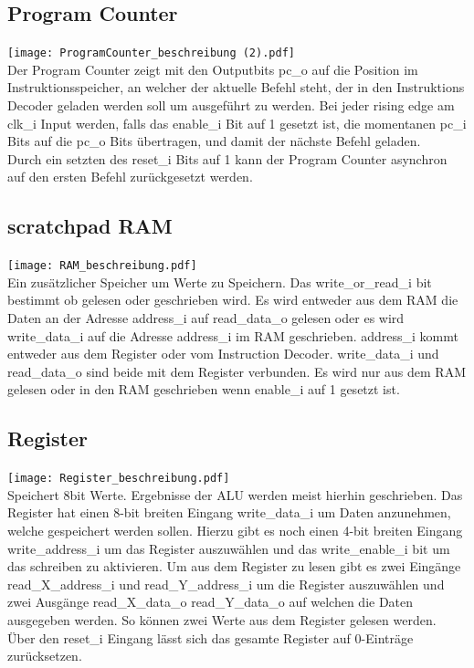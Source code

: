 \documentclass{scrartcl}
\begin{document}
\subsection{Program Counter}
\texttt{[image: ProgramCounter\_beschreibung (2).pdf]}\\
Der Program Counter zeigt mit den Outputbits pc\_o auf die Position im Instruktionsspeicher, an welcher der aktuelle Befehl steht, der in den Instruktions Decoder geladen werden soll um ausgeführt zu werden. Bei jeder rising edge am clk\_i Input werden, falls das enable\_i Bit auf 1 gesetzt ist, die momentanen pc\_i Bits auf die pc\_o Bits übertragen, und damit der nächste Befehl geladen. \\
Durch ein setzten des reset\_i Bits auf 1 kann der Program Counter asynchron auf den ersten Befehl zurückgesetzt werden.
\subsection{scratchpad RAM}
\texttt{[image: RAM\_beschreibung.pdf]}\\
Ein zusätzlicher Speicher um Werte zu Speichern. Das write\_or\_read\_i bit bestimmt ob gelesen oder geschrieben wird. Es wird entweder aus dem RAM die Daten an der Adresse address\_i auf read\_data\_o gelesen  oder es wird write\_data\_i auf die Adresse address\_i im RAM geschrieben. address\_i kommt entweder aus dem Register oder vom Instruction Decoder. write\_data\_i und read\_data\_o sind beide mit dem Register verbunden. Es wird nur aus dem RAM gelesen oder in den RAM geschrieben wenn enable\_i auf 1 gesetzt ist.
\subsection{Register}
\texttt{[image: Register\_beschreibung.pdf]}\\
Speichert 8bit Werte. Ergebnisse der ALU werden meist hierhin geschrieben. Das Register hat einen 8-bit breiten Eingang write\_data\_i um Daten anzunehmen, welche gespeichert werden sollen. Hierzu gibt es noch einen 4-bit breiten Eingang write\_address\_i um das Register auszuwählen und das write\_enable\_i bit um das schreiben zu aktivieren. Um aus dem Register zu lesen gibt es zwei Eingänge read\_X\_address\_i und read\_Y\_address\_i um die Register auszuwählen und zwei Ausgänge read\_X\_data\_o read\_Y\_data\_o auf welchen die Daten ausgegeben werden. So können zwei Werte aus dem Register gelesen werden. Über den reset\_i Eingang lässt sich das gesamte Register auf 0-Einträge zurücksetzen.
\end{document}
